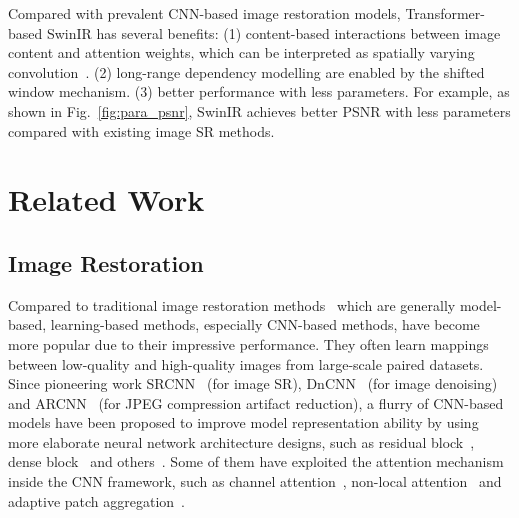 \documentclass[10pt,twocolumn,letterpaper]{article}
\newlength \g
\begin{document}
Compared with prevalent CNN-based image restoration models, Transformer-based SwinIR has several benefits: (1) content-based interactions between image content and attention weights, which can be interpreted as spatially varying convolution~\cite{cordonnier2019SAvsConv, elsayed2020revisiting, vaswani2021SAhaloing}. (2) long-range dependency modelling are enabled by the shifted window mechanism. (3) better performance with less parameters. For example, as shown in Fig.~\ref{fig:para_psnr}, SwinIR achieves better PSNR with less parameters compared with existing image SR methods. 


\section{Related Work}
\subsection{Image Restoration}
Compared to traditional image restoration methods~\cite{gu2012fast, timofte2013anchored, timofte2014a, michaeli2013nonparametric, he2010darkchannel} which are generally model-based, learning-based methods, especially CNN-based methods, have become more popular due to their impressive performance. They often learn mappings between low-quality and high-quality images from large-scale paired datasets. Since pioneering work SRCNN~\cite{dong2014srcnn} (for image SR), DnCNN~\cite{zhang2017DnCNN} (for image denoising) and ARCNN~\cite{dong2015compression} (for JPEG compression artifact reduction), a flurry of CNN-based models have been proposed to improve model representation ability by using more elaborate neural network architecture designs, such as residual block~\cite{kim2016vdsr, cavigelli2017cas, zhang2021DPIR}, dense block~\cite{wang2018esrgan, zhang2018RDN, zhang2020RDNIR} and others~\cite{chen2016TNRD, lai2017LapSRN, zhang2018srmd, wang2019learning, wang2021unsupervised, wang2021learning, liang2021fkp, liang21hcflow, liang21manet, zhang2018ffdnet, tai2017memnet, isobe2020video, wei2021unsupervised, guo2020closed, cheng2021mfagan, deng2021deep, zhang2019RNAN, peng2019dsnet, jia2019focnet, fu2019jpeg, kim2019pseudo, fu2021model}. Some of them have exploited the attention mechanism inside the CNN framework, such as channel attention~\cite{zhang2018rcan, dai2019SAN, niu2020HAN}, non-local attention~\cite{liu2018NLRN, mei2021NLSA} and adaptive patch aggregation~\cite{zhou2020IGNN}.
\end{document}
